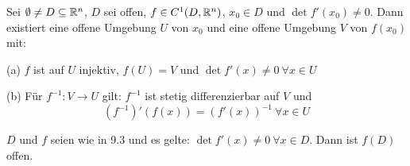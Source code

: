 \documentclass[a4paper,twoside,DIV15,BCOR12mm,chapterprefix=true,headings=twolinechapter]{scrbook}
\begin{document}
\begin{satz}
Sei $\emptyset \ne D \subseteq \mathbb{R} ^n$, $D$ sei offen, $f\in C^1(D, \mathbb{R}^n)$, $x_0\in D$ und $\det f'(x_0) \ne 0$. Dann existiert eine offene Umgebung $U$ von $x_0$ und eine offene Umgebung $V$ von $f(x_0)$ mit:
\begin{liste}
\item[(a)] $f$ ist auf $U$ injektiv, $f(U)=V$ und $\det f'(x) \ne 0 \ \forall x\in U$
\item[(b)] Für $f^{-1}: V\to U$ gilt: $f^{-1}$ ist stetig differenzierbar auf $V$ und $$(f^{-1})'(f(x)) = (f'(x))^{-1}\ \forall x\in U$$
\end{liste}

\end{satz}

\begin{folgerung}
$D$ und $f$ seien wie in 9.3 und es gelte: $\det f'(x) \ne 0 \ \forall x\in D$. Dann ist $f(D)$ offen.
\end{folgerung}
\end{document}
